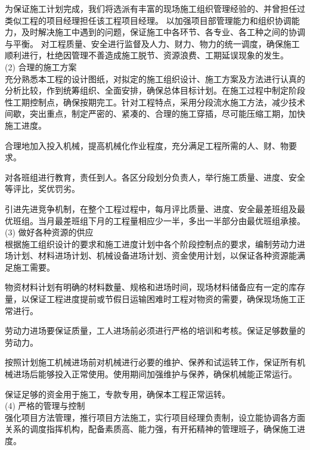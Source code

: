 为保证施工计划完成，我们将选派有丰富的现场施工组织管理经验的、并曾担任过类似工程的项目经理担任该工程项目经理。
以加强项目部管理能力和组织协调能力，及时解决施工中遇到的问题，保证施工中各环节、各专业、各工种之间的协调与平衡。
对工程质量、安全进行监督及人力、财力、物力的统一调度，确保施工顺利进行，杜绝因管理不善造成施工脱节、资源浪费、工期延误现象的发生。\\

(2) 合理的施工方案\\

 充分熟悉本工程的设计图纸，对拟定的施工组织设计、施工方案及方法进行认真的分析比较，作到统筹组织、全面安排，确保总体目标计划。在施工过程中制定阶段性工期控制点，确保按期完工。针对工程特点，采用分段流水施工方法，减少技术间歇，突出重点，制定严密的、紧凑的、合理的施工穿插，尽可能压缩工期，加快施工进度。

 合理地加入投入机械，提高机械化作业程度，充分满足工程所需的人、财、物要求。

 对各班组进行教育，责任到人。各区分段划分负责人，举行施工质量、进度、安全等评比，奖优罚劣。

 引进先进竞争机制，在整个工程过程中，每月评比质量、进度、安全最差班组及最优班组。当月最差班组下月的工程量相应少一半，多出一半部分由最优班组承接。\\


(3) 做好各种资源的供应\\

 根据施工组织设计的要求和施工进度计划中各个阶段控制点的要求，编制劳动力进场计划、材料进场计划、机械设备进场计划、资金使用计划，以保证各种资源能满足施工需要。

 物资材料计划有明确的材料数量、规格和进场时间，现场材料储备应有一定的库存量，以保证工程进度提前或节假日运输困难时工程对物资的需要，确保现场施工正常进行。

 劳动力进场要保证质量，工人进场前必须进行严格的培训和考核。保证足够数量的劳动力。

 按照计划施工机械进场前对机械进行必要的维护、保养和试运转工作，保证所有机械进场后能够投入正常使用。使用期间加强维护与保养，确保机械能正常运行。

 保证足够的资金用于施工，专款专用，确保本工程正常运转。\\


(4) 严格的管理与控制\\

 强化项目方法管理，推行项目方法施工，实行项目经理负责制，设立能协调各方面关系的调度指挥机构，配备素质高、能力强，有开拓精神的管理班子，确保施工进度。

